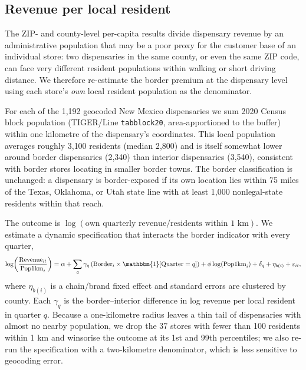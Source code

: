 

\subsection{Revenue per local resident}
\label{sec:localresident}

The ZIP- and county-level per-capita results divide dispensary revenue by an
administrative population that may be a poor proxy for the customer base of an
individual store: two dispensaries in the same county, or even the same ZIP
code, can face very different resident populations within walking or short
driving distance. We therefore re-estimate the border premium at the
dispensary level using each store's \emph{own} local resident population as the
denominator.

For each of the 1{,}192 geocoded New Mexico dispensaries we sum 2020 Census
block population (TIGER/Line \texttt{tabblock20}, area-apportioned to the buffer)
within one kilometre of the dispensary's coordinates. This local population
averages roughly 3{,}100 residents (median 2{,}800) and is itself somewhat lower
around border dispensaries (2{,}340) than interior dispensaries (3{,}540),
consistent with border stores locating in smaller border towns. The border
classification is unchanged: a dispensary is border-exposed if its own location
lies within 75 miles of the Texas, Oklahoma, or Utah state line with at least
1{,}000 nonlegal-state residents within that reach.

The outcome is $\log(\text{own quarterly revenue} / \text{residents within 1 km})$.
We estimate a dynamic specification that interacts the border indicator with
every quarter,
%
\begin{equation}
\log\!\left(\frac{\text{Revenue}_{it}}{\text{Pop1km}_i}\right)
= \alpha + \sum_q \gamma_q\left(\text{Border}_i \times \mathbbm{1}[\text{Quarter}=q]\right)
+ \phi \log(\text{Pop1km}_i) + \delta_q + \eta_{b(i)} + \varepsilon_{it},
\end{equation}
%
where $\eta_{b(i)}$ is a chain/brand fixed effect and standard errors are
clustered by county. Each $\gamma_q$ is the border--interior difference in log
revenue per local resident in quarter $q$. Because a one-kilometre radius leaves
a thin tail of dispensaries with almost no nearby population, we drop the 37
stores with fewer than 100 residents within 1 km and winsorise the outcome at
its 1st and 99th percentiles; we also re-run the specification with a
two-kilometre denominator, which is less sensitive to geocoding error.


